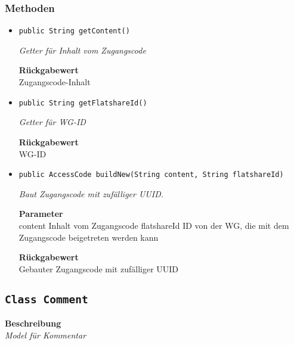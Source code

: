     \subsubsection*{Methoden}
    \begin{itemize}
    	\item{\texttt{public String getContent()}}
    	
    	\textit{Getter für Inhalt vom Zugangscode}
    	
    	
    	
    	\textbf{Rückgabewert} \\
    	Zugangscode-Inhalt        \item{\texttt{public String getFlatshareId()}}
    	
    	\textit{Getter für WG-ID}
    	
    	
    	
    	\textbf{Rückgabewert} \\
    	WG-ID        \item{\texttt{public AccessCode buildNew(String content, String flatshareId)}}
    	
    	\textit{Baut Zugangscode mit zufälliger UUID.}
    	
    	\textbf{Parameter} \\
    	content Inhalt vom Zugangscode
    	flatshareId ID von der WG, die mit dem Zugangscode beigetreten werden kann
    	
    	\textbf{Rückgabewert} \\
    	Gebauter Zugangscode mit zufälliger UUID
    \end{itemize}
    \subsection{\texttt{Class Comment}}
    \textbf{Beschreibung} \\
    \textit{Model für Kommentar}
